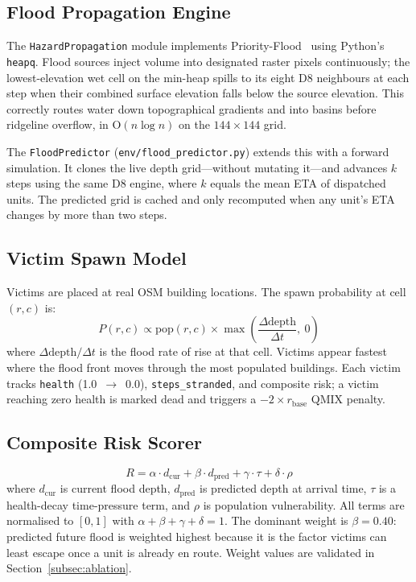 \documentclass[conference]{IEEEtran}
\begin{document}
\subsection{Flood Propagation Engine}

The \texttt{HazardPropagation} module implements Priority-Flood~\cite{barnes2014priority}
using Python's \texttt{heapq}.
Flood sources inject volume into designated raster pixels continuously;
the lowest-elevation wet cell on the min-heap spills to its eight D8
neighbours at each step when their combined surface elevation falls below
the source elevation.
This correctly routes water down topographical gradients and into basins
before ridgeline overflow, in O$(n \log n)$ on the $144 \times 144$ grid.

The \texttt{FloodPredictor} (\texttt{env/flood\_predictor.py}) extends this
with a forward simulation.
It clones the live depth grid---without mutating it---and advances $k$ steps
using the same D8 engine, where $k$ equals the mean ETA of dispatched units.
The predicted grid is cached and only recomputed when any unit's ETA changes
by more than two steps.

\subsection{Victim Spawn Model}

Victims are placed at real OSM building locations.
The spawn probability at cell $(r, c)$ is:
\begin{equation}
  P(r,c) \propto \text{pop}(r,c) \times \max\!\left(\frac{\Delta\text{depth}}{\Delta t},\ 0\right)
  \label{eq:spawn}
\end{equation}
where $\Delta\text{depth}/\Delta t$ is the flood rate of rise at that cell.
Victims appear fastest where the flood front moves through the most populated
buildings.
Each victim tracks \texttt{health} (1.0~$\to$~0.0), \texttt{steps\_stranded},
and composite risk; a victim reaching zero health is marked dead and triggers
a $-2 \times r_\text{base}$ QMIX penalty.

\subsection{Composite Risk Scorer}

\begin{equation}
  R = \alpha \cdot d_\text{cur} + \beta \cdot d_\text{pred} +
      \gamma \cdot \tau + \delta \cdot \rho
  \label{eq:risk}
\end{equation}
where $d_\text{cur}$ is current flood depth, $d_\text{pred}$ is predicted depth
at arrival time, $\tau$ is a health-decay time-pressure term, and $\rho$ is
population vulnerability.
All terms are normalised to $[0, 1]$ with $\alpha + \beta + \gamma + \delta = 1$.
The dominant weight is $\beta = 0.40$: predicted future flood is weighted
highest because it is the factor victims can least escape once a unit
is already en route.
Weight values are validated in Section~\ref{subsec:ablation}.
\end{document}
